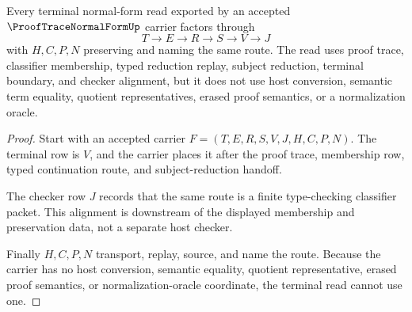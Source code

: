 \begin{theorem}
\label{thm:proof-trace-normal-form-terminal-route}
Every terminal normal-form read exported by an accepted $\ProofTraceNormalFormUp$ carrier factors through
$$
T \to E \to R \to S \to V \to J
$$
with $H,C,P,N$ preserving and naming the same route. The read uses proof trace, classifier membership, typed reduction replay, subject reduction, terminal boundary, and checker alignment, but it does not use host conversion, semantic term equality, quotient representatives, erased proof semantics, or a normalization oracle.
\end{theorem}
\begin{proof}
Start with an accepted carrier $F=(T,E,R,S,V,J,H,C,P,N)$. The terminal row is $V$, and the carrier places it after the proof trace, membership row, typed continuation route, and subject-reduction handoff.

The checker row $J$ records that the same route is a finite type-checking classifier packet. This alignment is downstream of the displayed membership and preservation data, not a separate host checker.

Finally $H,C,P,N$ transport, replay, source, and name the route. Because the carrier has no host conversion, semantic equality, quotient representative, erased proof semantics, or normalization-oracle coordinate, the terminal read cannot use one.
\end{proof}

